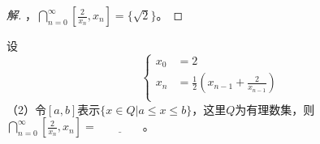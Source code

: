 \documentclass{beamer}
\begin{document}
\begin{CJK*}{UTF8}{gbsn}
\begin{frame}[t]
\begin{proof}[解]
，$\bigcap_{n=0}^{\infty}[\frac{2}{x_n},x_n]=\{\sqrt{2}\}$。
\end{proof}  

\end{frame}

\begin{frame}[t]
  \begin{Exercise}
    设\[
    \begin{cases}
      x_0&=2\\
      x_n&=\frac{1}{2}(x_{n-1}+\frac{2}{x_{n-1}})\\
    \end{cases}
    \] 
  （2）令$[a,b]$表示$\{x\in Q|a\leq x \leq b\}$，这里$Q$为有理数集，则$\bigcap_{n=0}^{\infty}[\frac{2}{x_n},x_n]=\underline{\quad\quad\quad\quad}$。
  \end{Exercise}
\end{frame}


\end{CJK*}
\end{document}
